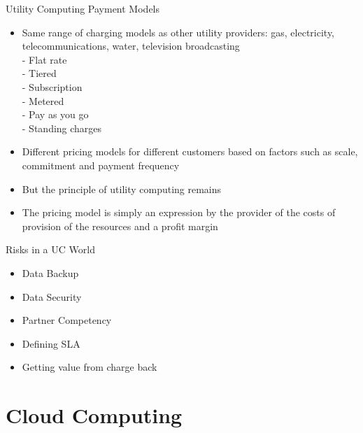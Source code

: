 \documentclass{SKP-beamer}
\begin{document}
\begin{frame}{ Utility Computing Payment Models}
	\begin{itemize}
		
		\item   Same range of charging models as other utility providers: gas, electricity, telecommunications, water, 
		television broadcasting \\
		 - Flat rate \\
		 - Tiered \\
		 - Subscription \\
		 - Metered \\
		 - Pay as you go \\
		 - Standing charges \\
		\item Different pricing models for different customers based on factors such as scale, commitment and 
		payment frequency
		\item But the principle of utility computing remains
		\item The pricing model is simply an expression by the provider of the costs of provision of the resources and a 
		profit margin
		
		
		
		
		
	\end{itemize}
\end{frame}


\begin{frame}{ Risks in a UC World}
	\begin{itemize}
		
		\item  Data Backup
		\item Data Security
		\item Partner Competency
		\item Defining SLA
		\item Getting value from charge back
		
	\end{itemize}
\end{frame}


\section{\textbf{Cloud Computing}}
\end{document}
